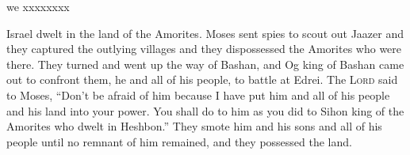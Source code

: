 \begin{inparaenum}
  \pb we xxxx\pa xxxx%
  
   Israel dwelt in the land of the Amorites.%
   Moses sent spies to scout out Jaazer and they captured the outlying villages and they dispossessed the Amorites who were there.%
   They turned and went up the way of Bashan, and Og king of Bashan came out to confront them, he and all of his people, to battle at Edrei.%
   The \textsc{Lord} said to Moses, ``Don't be afraid of him because I have put him and all of his people and his land into your power. You shall do to him as you did to Sihon king of the Amorites who dwelt in Heshbon.''%
   They smote him and his sons and all of his people until no remnant of him remained, and they possessed the land.%
\end{inparaenum}
